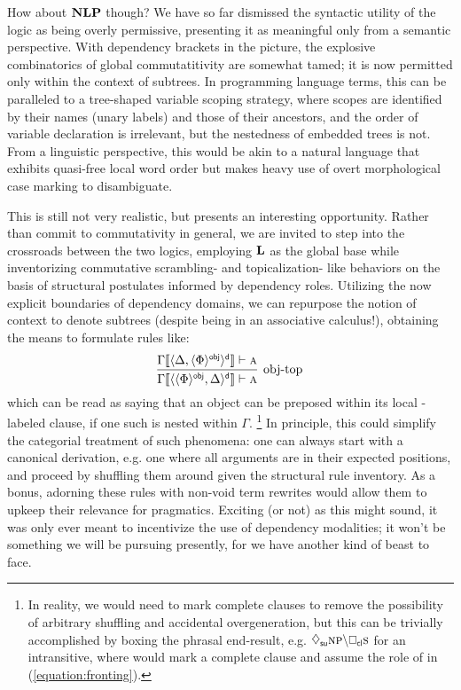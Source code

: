 How about $\textbf{NLP}$ though?
We have so far dismissed the syntactic utility of the logic as being overly permissive, presenting it as meaningful only from a semantic perspective.
With dependency brackets in the picture, the explosive combinatorics of global commutatitivity are somewhat tamed; it is now permitted only within the context of subtrees.
In programming language terms, this can be paralleled to a tree-shaped variable scoping strategy, where scopes are identified by their names (unary labels) and those of their ancestors, and the order of variable declaration is irrelevant, but the nestedness of embedded trees is not.
From a linguistic perspective, this would be akin to a natural language that exhibits quasi-free local word order but makes heavy use of overt morphological case marking to disambiguate.

This is still not very realistic, but presents an interesting opportunity.
Rather than commit to commutativity in general, we are invited to step into the crossroads between the two logics, employing $\textbf{L}$ as the global base while inventorizing commutative scrambling- and topicalization- like behaviors on the basis of structural postulates informed by dependency roles.
Utilizing the now explicit boundaries of dependency domains, we can repurpose the notion of context to denote subtrees (despite being in an associative calculus!), obtaining the means to formulate rules like:
\begin{equation}\label{equation:fronting}
	\infer[\text{obj-top}]
		{\Gamma\ctx{\dbra{\dbra{\Phi}{obj},\Delta}{d}} \vdash \prop{a}}
		{\Gamma\ctx{\dbra{\Delta, \dbra{\Phi}{obj}}{d}} \vdash \prop{a}}
\end{equation}
which can be read as saying that an object can be preposed within its local -labeled clause, if one such is nested within $\Gamma$.%
	\footnote{In reality, we would need to mark complete clauses to remove the possibility of arbitrary shuffling and accidental overgeneration, but this can be trivially accomplished by boxing the phrasal end-result, e.g. $\ddia{su}\np[s]\divleft\dbox{cl}{\s[s]}$ for an intransitive, where  would mark a complete clause and assume the role of  in (\ref{equation:fronting}).}
In principle, this could simplify the categorial treatment of such phenomena: one can always start with a canonical derivation, e.g. one where all arguments are in their expected positions, and proceed by shuffling them around given the structural rule inventory.
As a bonus, adorning these rules with non-void term rewrites would allow them to upkeep their relevance for pragmatics.
Exciting (or not) as this might sound, it was only ever meant to incentivize the use of dependency modalities; it won't be something we will be pursuing presently, for we have another kind of beast to face.


